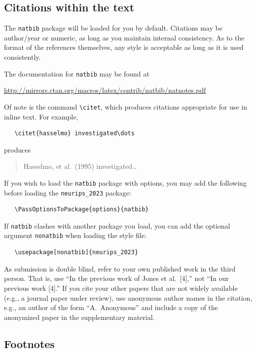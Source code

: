 \documentclass{article}
\begin{document}
\begin{CJK}{UTF8}{gbsn}
\subsection{Citations within the text}


The \verb+natbib+ package will be loaded for you by default.  Citations may be
author/year or numeric, as long as you maintain internal consistency.  As to the
format of the references themselves, any style is acceptable as long as it is
used consistently.


The documentation for \verb+natbib+ may be found at
\begin{center}
  \url{http://mirrors.ctan.org/macros/latex/contrib/natbib/natnotes.pdf}
\end{center}
Of note is the command \verb+\citet+, which produces citations appropriate for
use in inline text.  For example,
\begin{verbatim}
   \citet{hasselmo} investigated\dots
\end{verbatim}
produces
\begin{quote}
  Hasselmo, et al.\ (1995) investigated\dots
\end{quote}


If you wish to load the \verb+natbib+ package with options, you may add the
following before loading the \verb+neurips_2023+ package:
\begin{verbatim}
   \PassOptionsToPackage{options}{natbib}
\end{verbatim}


If \verb+natbib+ clashes with another package you load, you can add the optional
argument \verb+nonatbib+ when loading the style file:
\begin{verbatim}
   \usepackage[nonatbib]{neurips_2023}
\end{verbatim}


As submission is double blind, refer to your own published work in the third
person. That is, use ``In the previous work of Jones et al.\ [4],'' not ``In our
previous work [4].'' If you cite your other papers that are not widely available
(e.g., a journal paper under review), use anonymous author names in the
citation, e.g., an author of the form ``A.\ Anonymous'' and include a copy of the anonymized paper in the supplementary material.


\subsection{Footnotes}



\end{CJK}
\end{document}
